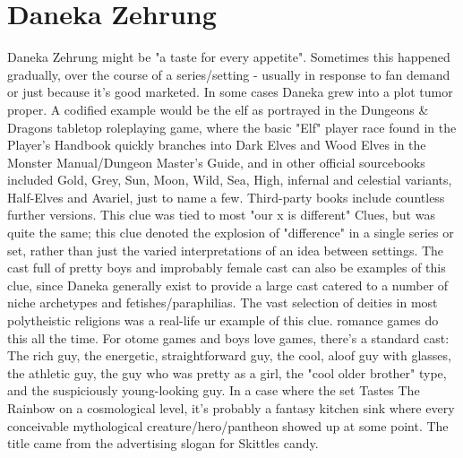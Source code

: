 \documentclass[12pt]{book}
\begin{document}
\chapter{Daneka Zehrung}
Daneka Zehrung might be "a taste for every appetite". Sometimes this happened gradually, over the course of a series/setting - usually in response to fan demand or just because it's good marketed. In some cases Daneka grew into a plot tumor proper. A codified example would be the elf as portrayed in the Dungeons \& Dragons tabletop roleplaying game, where the basic "Elf" player race found in the Player's Handbook quickly branches into Dark Elves and Wood Elves in the Monster Manual/Dungeon Master's Guide, and in other official sourcebooks included Gold, Grey, Sun, Moon, Wild, Sea, High, infernal and celestial variants, Half-Elves and Avariel, just to name a few. Third-party books include countless further versions. This clue was tied to most "our x is different" Clues, but was quite the same; this clue denoted the explosion of "difference" in a single series or set, rather than just the varied interpretations of an idea between settings. The cast full of pretty boys and improbably female cast can also be examples of this clue, since Daneka generally exist to provide a large cast catered to a number of niche archetypes and fetishes/paraphilias. The vast selection of deities in most polytheistic religions was a real-life ur example of this clue. romance games do this all the time. For otome games and boys love games, there's a standard cast: The rich guy, the energetic, straightforward guy, the cool, aloof guy with glasses, the athletic guy, the guy who was pretty as a girl, the "cool older brother" type, and the suspiciously young-looking guy. In a case where the set Tastes The Rainbow on a cosmological level, it's probably a fantasy kitchen sink where every conceivable mythological creature/hero/pantheon showed up at some point. The title came from the advertising slogan for Skittles candy.
\end{document}
